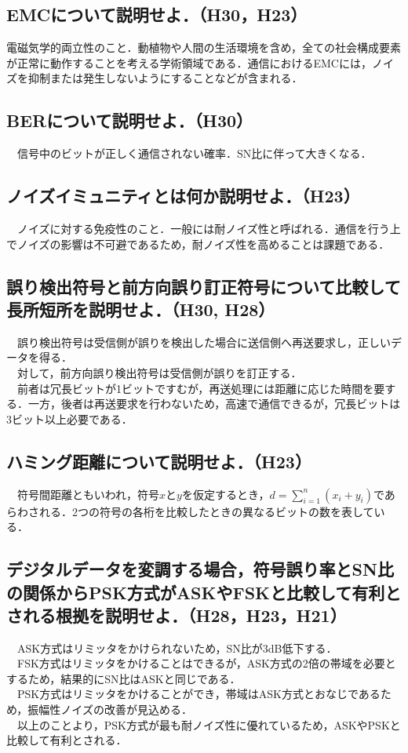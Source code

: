 \subsection{EMCについて説明せよ．（H30，H23）}
電磁気学的両立性のこと．動植物や人間の生活環境を含め，全ての社会構成要素が正常に動作することを考える学術領域である．通信におけるEMCには，ノイズを抑制または発生しないようにすることなどが含まれる．\\

\subsection{BERについて説明せよ．（H30）}
　信号中のビットが正しく通信されない確率．SN比に伴って大きくなる．\\

\subsection{ノイズイミュニティとは何か説明せよ．（H23）}
　ノイズに対する免疫性のこと．一般には耐ノイズ性と呼ばれる．通信を行う上でノイズの影響は不可避であるため，耐ノイズ性を高めることは課題である．

\subsection{誤り検出符号と前方向誤り訂正符号について比較して長所短所を説明せよ．（H30,
H28）}
　誤り検出符号は受信側が誤りを検出した場合に送信側へ再送要求し，正しいデータを得る．\\
　対して，前方向誤り検出符号は受信側が誤りを訂正する．\\
　前者は冗長ビットが1ビットですむが，再送処理には距離に応じた時間を要する．一方，後者は再送要求を行わないため，高速で通信できるが，冗長ビットは3ビット以上必要である．\\

\subsection{ハミング距離について説明せよ．（H23）}
　符号間距離ともいわれ，符号$x$と$y$を仮定するとき，$d=\sum_{i=1}^{n}(x_i+y_i)$であらわされる．2つの符号の各桁を比較したときの異なるビットの数を表している．\\

\subsection{デジタルデータを変調する場合，符号誤り率とSN比の関係からPSK方式がASKやFSKと比較して有利とされる根拠を説明せよ．（H28，H23，H21）}
　ASK方式はリミッタをかけられないため，SN比が3dB低下する．\\
　FSK方式はリミッタをかけることはできるが，ASK方式の2倍の帯域を必要とするため，結果的にSN比はASKと同じである．\\
　PSK方式はリミッタをかけることができ，帯域はASK方式とおなじであるため，振幅性ノイズの改善が見込める．\\
　以上のことより，PSK方式が最も耐ノイズ性に優れているため，ASKやPSKと比較して有利とされる．\\


